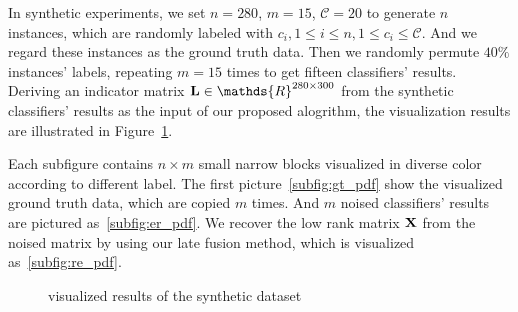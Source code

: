 \documentclass[letterpaper]{article}
\def\calC{{\mathcal{C}}}
\def\bL{{\bf L}}
\def\dsR{\mathds{R}}
\def\bX{{\bf X}}
\def\bX{{\bf X}}
\begin{document}
In synthetic experiments, we set $n = 280$, $m = 15$, $\calC = 20$ to generate $n$ instances, which are randomly labeled with $c_i, 1 \leq i \leq n, 1 \leq c_i \leq \calC$.
And we regard these instances as the ground truth data.
Then we randomly permute $40\%$ instances' labels, repeating $m = 15$ times to get fifteen classifiers' results.
Deriving an indicator matrix $\bL \in \dsR^{280 \times 300}$ from the synthetic classifiers' results as the input of our proposed alogrithm,
the visualization results are illustrated in Figure~\ref{fig:ensemble_cluster}.

Each subfigure contains $n\times m$ small narrow blocks visualized in diverse color according to different label.
The first picture~\ref{subfig:gt_pdf} show the visualized ground truth data, which are copied $m$ times.
And $m$ noised classifiers' results are pictured as~\ref{subfig:er_pdf}.
We recover the low rank matrix $\bX$ from the noised matrix by using our late fusion method, which is visualized as~\ref{subfig:re_pdf}.

\begin{figure}[htp]
\center
    \caption{visualized results of the synthetic dataset} \label{fig:ensemble_cluster}
\end{figure}
\end{document}
